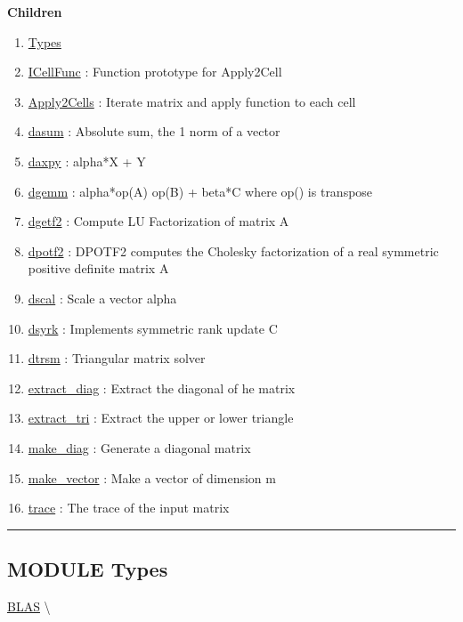 \textbf{Children}
\begin{enumerate}
\item \hyperlink{ecldoc:BLAS.Types}{Types}
\item \hyperlink{ecldoc:blas.icellfunc}{ICellFunc}
: Function prototype for Apply2Cell
\item \hyperlink{ecldoc:blas.apply2cells}{Apply2Cells}
: Iterate matrix and apply function to each cell
\item \hyperlink{ecldoc:blas.dasum}{dasum}
: Absolute sum, the 1 norm of a vector
\item \hyperlink{ecldoc:blas.daxpy}{daxpy}
: alpha*X + Y
\item \hyperlink{ecldoc:blas.dgemm}{dgemm}
: alpha*op(A) op(B) + beta*C where op() is transpose
\item \hyperlink{ecldoc:blas.dgetf2}{dgetf2}
: Compute LU Factorization of matrix A
\item \hyperlink{ecldoc:blas.dpotf2}{dpotf2}
: DPOTF2 computes the Cholesky factorization of a real symmetric positive definite matrix A
\item \hyperlink{ecldoc:blas.dscal}{dscal}
: Scale a vector alpha
\item \hyperlink{ecldoc:blas.dsyrk}{dsyrk}
: Implements symmetric rank update C
\item \hyperlink{ecldoc:blas.dtrsm}{dtrsm}
: Triangular matrix solver
\item \hyperlink{ecldoc:blas.extract_diag}{extract\_diag}
: Extract the diagonal of he matrix
\item \hyperlink{ecldoc:blas.extract_tri}{extract\_tri}
: Extract the upper or lower triangle
\item \hyperlink{ecldoc:blas.make_diag}{make\_diag}
: Generate a diagonal matrix
\item \hyperlink{ecldoc:blas.make_vector}{make\_vector}
: Make a vector of dimension m
\item \hyperlink{ecldoc:blas.trace}{trace}
: The trace of the input matrix
\end{enumerate}

\rule{\linewidth}{0.5pt}

\subsection*{\textsf{\colorbox{headtoc}{\color{white} MODULE}
Types}}

\hypertarget{ecldoc:BLAS.Types}{}
\hspace{0pt} \hyperlink{ecldoc:blas}{BLAS} \textbackslash 

